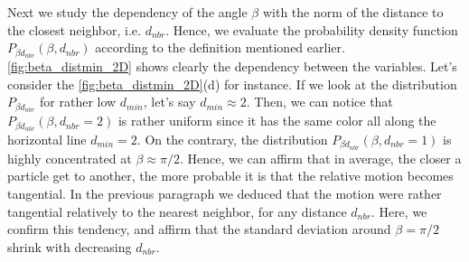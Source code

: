 Next we study the dependency of the angle $\beta$ with the norm of the distance to the closest neighbor, i.e. $d_{nbr}$.
Hence, we evaluate the probability density function $P_{\beta d_{nbr}}(\beta, d_{nbr})$ according to the definition mentioned earlier. 
\ref{fig:beta_distmin_2D} shows clearly the dependency between the variables. 
Let's consider the \ref{fig:beta_distmin_2D}(d) for instance. 
If we look at the distribution $P_{\beta d_{nbr}}$ for rather low $d_{min}$, let's say $d_{min}\approx 2$.
Then, we can notice that $P_{\beta d_{nbr}}(\beta, d_{nbr} = 2)$ is rather uniform since it has the same color all along the horizontal line $d_{min} = 2$.
On the contrary, the distribution  $P_{\beta d_{nbr}}(\beta, d_{nbr} = 1)$ is highly concentrated at $\beta \approx \pi/2$.
Hence, we can affirm that in average, the closer a particle get to another, the more probable it is that the relative motion becomes tangential.
In the previous paragraph we deduced that the motion were rather tangential relatively to the nearest neighbor, for any distance $d_{nbr}$.
Here, we confirm this tendency, and affirm that the standard deviation around $\beta =\pi/2$ shrink with decreasing $d_{nbr}$.
